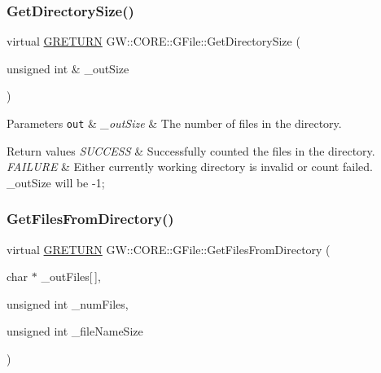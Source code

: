\subsubsection{\texorpdfstring{Get\+Directory\+Size()}{GetDirectorySize()}}
{\footnotesize\ttfamily virtual \hyperlink{namespace_g_w_a69b1aaebac1cac8049825f035884c95b}{G\+R\+E\+T\+U\+RN} G\+W\+::\+C\+O\+R\+E\+::\+G\+File\+::\+Get\+Directory\+Size (\begin{DoxyParamCaption}\item[{unsigned int \&}]{\+\_\+out\+Size }\end{DoxyParamCaption})\hspace{0.3cm}{\ttfamily [pure virtual]}}


\begin{DoxyParams}[1]{Parameters}
\mbox{\tt out}  & {\em \+\_\+out\+Size} & The number of files in the directory.\\
\hline
\end{DoxyParams}

\begin{DoxyRetVals}{Return values}
{\em S\+U\+C\+C\+E\+SS} & Successfully counted the files in the directory. \\
\hline
{\em F\+A\+I\+L\+U\+RE} & Either currently working directory is invalid or count failed. \+\_\+out\+Size will be -\/1; \\
\hline
\end{DoxyRetVals}
\hypertarget{class_g_w_1_1_c_o_r_e_1_1_g_file_acf75a8b6b63e14d2d646e83c4974694d}{}\label{class_g_w_1_1_c_o_r_e_1_1_g_file_acf75a8b6b63e14d2d646e83c4974694d} 
\subsubsection{\texorpdfstring{Get\+Files\+From\+Directory()}{GetFilesFromDirectory()}}
{\footnotesize\ttfamily virtual \hyperlink{namespace_g_w_a69b1aaebac1cac8049825f035884c95b}{G\+R\+E\+T\+U\+RN} G\+W\+::\+C\+O\+R\+E\+::\+G\+File\+::\+Get\+Files\+From\+Directory (\begin{DoxyParamCaption}\item[{char $\ast$}]{\+\_\+out\+Files\mbox{[}$\,$\mbox{]},  }\item[{unsigned int}]{\+\_\+num\+Files,  }\item[{unsigned int}]{\+\_\+file\+Name\+Size }\end{DoxyParamCaption})\hspace{0.3cm}{\ttfamily [pure virtual]}}

